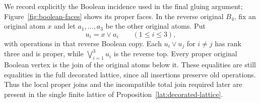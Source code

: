 We record explicitly the Boolean incidence used in the final gluing
argument; Figure~\ref{fig:boolean-faces} shows its proper faces.  In the reverse original $B_4$, fix an original atom $x$ and
let $a_1,\ldots,a_3$ be the other original atoms.  Put
\[
                    u_i=x\vee a_i\qquad(1\leq i\leq3),
\]
with operations in that reverse Boolean copy.  Each $u_i\vee u_j$
for $i\ne j$ has rank three and is proper, while
$\bigvee_{i=1}^3u_i$ is the reverse top.  Every proper original
Boolean vertex is the join of the original atoms below it.  These
equalities are still equalities in the full decorated lattice, since
all insertions preserve old operations.  Thus the local proper joins
and the incompatible total join required later are present in the
single finite lattice of Proposition~\ref{lat:decorated-lattice}.


